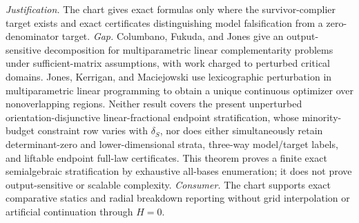 \documentclass{article}
\begin{document}
\par\smallskip\noindent \textit{Justification.} The chart gives exact formulas only where the survivor-complier target exists and exact certificates distinguishing model falsification from a zero-denominator target. \textit{Gap.} Columbano, Fukuda, and Jones \cite{ColumbanoFukudaJones2009} give an output-sensitive decomposition for multiparametric linear complementarity problems under sufficient-matrix assumptions, with work charged to perturbed critical domains. Jones, Kerrigan, and Maciejowski \cite{JonesKerriganMaciejowski2007} use lexicographic perturbation in multiparametric linear programming to obtain a unique continuous optimizer over nonoverlapping regions. Neither result covers the present unperturbed orientation-disjunctive linear-fractional endpoint stratification, whose minority-budget constraint row varies with \(\delta_S\), nor does either simultaneously retain determinant-zero and lower-dimensional strata, three-way model/target labels, and liftable endpoint full-law certificates. This theorem proves a finite exact semialgebraic stratification by exhaustive all-bases enumeration; it does not prove output-sensitive or scalable complexity. \textit{Consumer.} The chart supports exact comparative statics and radial breakdown reporting without grid interpolation or artificial continuation through \(H=0\).
\end{document}
